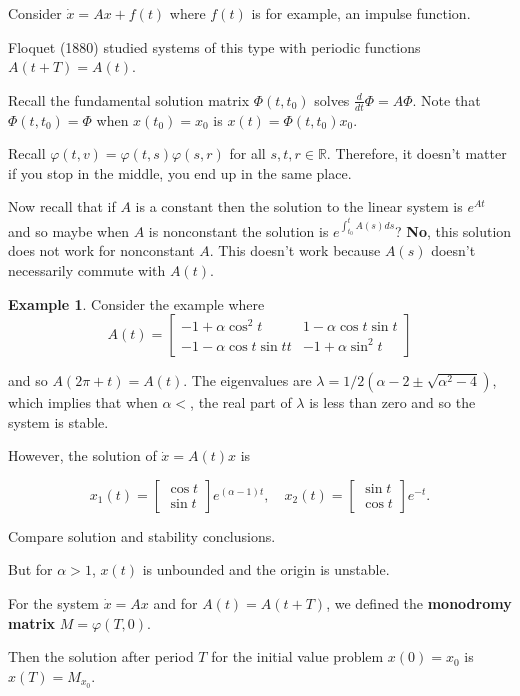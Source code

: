 \documentclass[12pt]{article}
\theoremstyle{definition}
\newtheorem*{example}{Example}
\begin{document}
Consider $\dot{x} = Ax + f(t)$ where $f(t)$ is for example, an impulse function.

Floquet (1880) studied systems of this type with periodic functions $A(t + T) = A(t)$.

Recall the fundamental solution matrix $\Phi(t, t_0)$ solves $\frac{d}{dt} \Phi = A \Phi$.
Note that $\Phi(t, t_0) = \Phi$ when $x(t_0) = x_0$ is $x(t) = \Phi(t, t_0)x_0$.

Recall $\varphi(t, v) = \varphi (t, s) \varphi(s, r)$ for all $s, t, r \in \mathbb{R}$.
Therefore, it doesn't matter if you stop in the middle, you end up in the same place.

Now recall that if $A$ is a constant then the solution to the linear system is $e^{At}$
and so maybe when $A$ is nonconstant the solution is $e^{\int_{t_0}^t A(s)ds}$?
\textbf{No}, this solution does not work for nonconstant $A$. This doesn't work
because $A(s)$ doesn't necessarily commute with $A(t)$.

\begin{example}
Consider the example where
\[
A(t) =
\begin{bmatrix}
-1 + \alpha \cos^2 t & 1 - \alpha \cos t \sin t \\
-1 - \alpha \cos t \sin t t & -1 + \alpha \sin^2 t
\end{bmatrix}
\]

and so $A(2\pi + t) = A(t)$. The eigenvalues are $\lambda = 1/2 (\alpha - 2 \pm \sqrt{\alpha^2 - 4})$,
which implies that when $\alpha <$, the real part of $\lambda$ is less than zero and so the
system is stable.

However, the solution of $\dot{x} = A(t)x$ is

\[
x_1(t) = 
\begin{bmatrix}
\cos t \\
\sin t
\end{bmatrix}
e^{(\alpha - 1)t},
\quad
x_2(t) =
\begin{bmatrix}
\sin t \\
\cos t
\end{bmatrix}
e^{-t}.
\]

Compare solution and stability conclusions.

But for $\alpha > 1$, $x(t)$ is unbounded and the origin is unstable.
\end{example}

For the system $\dot{x} = Ax$ and for $A(t) = A(t + T)$, we defined the \textbf{monodromy matrix} $M = \varphi (T, 0)$.

Then the solution after period $T$ for the initial value problem $x(0) = x_0$ is $x(T) = M_{x_{0}}$. 
\end{document}
